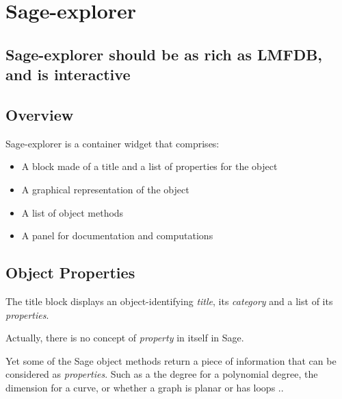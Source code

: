 \documentclass{deliverablereport}
\begin{document}

\section{Sage-explorer}
\label{sage-explorer}


\subsection{Sage-explorer should be as rich as LMFDB, and is interactive}



\subsection{Overview}

Sage-explorer is a container widget that comprises:

\begin{itemize}
  \item A block made of a title and a list of properties for the object
  \item A graphical representation of the object
  \item A list of object methods
  \item A panel for documentation and computations
\end{itemize}


\subsection{Object Properties}

The title block displays an object-identifying \emph{title}, its
\emph{category} and a list of its \emph{properties}.

Actually, there is no concept of \emph{property} in itself in Sage.

Yet some of the Sage object methods return a piece of information that
can be considered as \emph{properties}. Such as a the degree for a
polynomial degree, the dimension for a curve, or whether a graph is
planar or has loops ..
\end{document}
